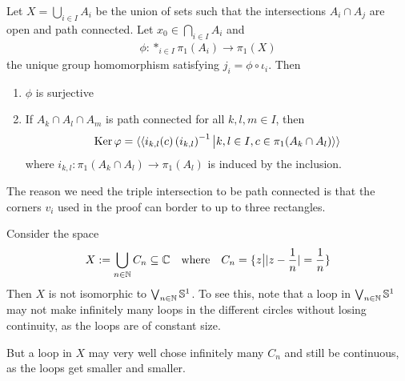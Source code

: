 \begin{thm}
  Let $X = \bigcup_{i \in I}A_i$ be the union of sets such that the intersections $A_i \cap A_j$ are open and path connected.
  Let $x_0 \in \bigcap_{i \in I}A_i$ and 
  \begin{align*}
    \phi: \ast_{i \in I}\pi_1(A_i) \to  \pi_1(X)
  \end{align*}
  the unique group homomorphism satisfying $j_i = \phi \circ \iota_i$.
  Then
  \begin{enumerate}
    \item $\phi$ is surjective
    \item If $A_k \cap A_l \cap A_m$ is path connected for all $k,l,m \in I$, then
      \begin{align*}
        \operatorname{Ker} \varphi = \langle\langle
            i_{k,l}(c) \left(
              i_{k,l}
            \right)^{-1}
            \big\vert
            k,l \in I,
            c \in \pi_1(A_k \cap A_l)
        \rangle\rangle
      \end{align*}
      where $i_{k,l}: \pi_1(A_k \cap A_l) \to  \pi_1(A_l)$ is induced by the inclusion.
  \end{enumerate}
\end{thm}

The reason we need the triple intersection to be path connected is that the corners $v_i$ used in the proof can border to up to three rectangles.

\begin{ex}
Consider the space
\begin{align*}
  X := \bigcup_{n \in \mathbb{N}}C_n \subseteq \mathbb{C} \quad \text{where} \quad C_n = \{z \big\vert \vert z - \frac{1}{n}\vert = \frac{1}{n}\}
\end{align*}
Then $X$ is not isomorphic to $\bigvee_{n \in \mathbb{N}}\mathbb{S}^{1}$. 
To see this, note that a loop in $\bigvee_{n \in \mathbb{N}}\mathbb{S}^{1}$ may not make infinitely many loops in the different circles without losing continuity, as the loops are of constant size.

But a loop in $X$ may very well chose infinitely many $C_n$ and still be continuous, as the loops get smaller and smaller.
\end{ex}


%
